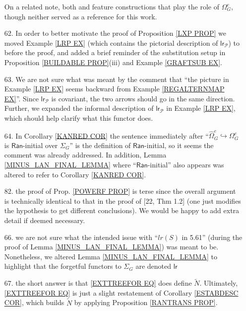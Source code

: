 \documentclass{article}
\begin{document}
\begin{itemize}
	On a related note, both 
	\cite{BB17} and \cite[App. C]{Cav}
	feature constructions that play the role of $\Omega^e_G$,
	though neither served as a reference for this work.



	\item[62.] 
	In order to better motivate the proof of 
	Proposition \ref{LXP PROP}
	we moved Example \ref{LRP EX}
	(which contains the pictorial description of $\mathsf{lr}_{\mathcal{P}}$) to before the proof,
	and added a brief reminder of the substitution setup in 
	Proposition \ref{BUILDABLE PROP}(iii)
	and Example \ref{GRAFTSUB EX}.

	\item[63.]
	We are not sure what was meant by the comment that
	``the picture in Example \ref{LRP EX} seems backward from
	Example \ref{REGALTERNMAP EX}''.
	Since $\mathsf{lr}_{\mathcal{P}}$
	is covariant, the two arrows should go in the same direction.
	Further, we expanded the informal description
	of $\mathsf{lr}_{\mathcal{P}}$
	in Example \ref{LRP EX},
	which should help clarify what this functor does.
	
	\item[64.]
	In Corollary \ref{KANRED COR} the sentence immediately after ``$\widehat{\Omega}^e_G \hookrightarrow \Omega^e_G$ is
	$\mathsf{Ran}$-initial over $\Sigma_G$''
	is the definition of $\mathsf{Ran}$-initial,
	so it seems the comment was already addressed.
	In addition, Lemma \ref{MINUS_LAN_FINAL_LEMMA} where ``$\mathsf{Ran}$-initial'' also appears was altered to refer to Corollary \ref{KANRED COR}.
	\item[82.] the proof of Prop. \ref{POWERF PROP} is terse since the overall argument is technically identical to that in the proof of [22, Thm 1.2] (one just modifies the hypothesis to get different conclusions).
	We would be happy to add extra detail if deemed necessary. 

	\item[66.] we are not sure what the intended issue with 
	``$lr(S)$ in 5.61'' 
	(during the proof of Lemma \ref{MINUS_LAN_FINAL_LEMMA})
	was meant to be.
	Nonetheless, we altered 
	Lemma \ref{MINUS_LAN_FINAL_LEMMA}
	to highlight that the forgetful functors to $\Sigma_G$
	are denoted $\mathsf{lr}$
	
	\item[67.] the short answer is that \eqref{EXTTREEFOR EQ} does define $\tilde{N}$.
	Ultimately, \eqref{EXTTREEFOR EQ} is just a slight restatement of Corollary \ref{ESTABDESC COR}, which builds 
	$\tilde{N}$ by applying Proposition \ref{RANTRANS PROP}.
	

\end{itemize}
\end{document}
